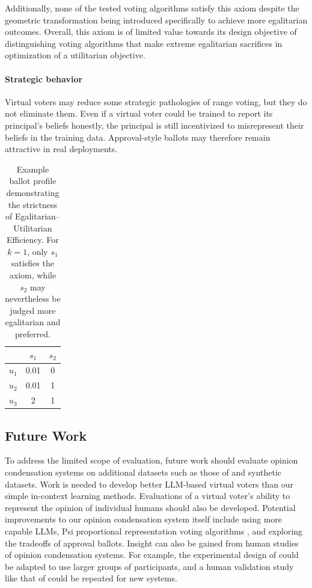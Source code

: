 \documentclass[11pt]{article}
\begin{document}
Additionally, none of the tested voting algorithms satisfy this axiom despite the geometric transformation being introduced specifically to achieve more egalitarian outcomes. Overall, this axiom is of limited value towards its design objective of distinguishing voting algorithms that make extreme egalitarian sacrifices in optimization of a utilitarian objective.

\paragraph{Strategic behavior}
Virtual voters may reduce some strategic pathologies of range voting, but they do not eliminate them. Even if a virtual voter could be trained to report its principal's beliefs honestly, the principal is still incentivized to misrepresent their beliefs in the training data. Approval-style ballots may therefore remain attractive in real deployments.

\begin{table}[t]
\centering
\begin{tabular}{lcc}
\hline
 & $s_1$ & $s_2$ \\
\hline
$u_1$ & 0.01 & 0 \\
$u_2$ & 0.01 & 1 \\
$u_3$ & 2 & 1 \\
\hline
\end{tabular}
\caption{Example ballot profile demonstrating the strictness of Egalitarian--Utilitarian Efficiency. For \(k=1\), only \(s_1\) satisfies the axiom, while \(s_2\) may nevertheless be judged more egalitarian and preferred.}
\label{tab:egal-util-strict}
\end{table}

\subsection{Future Work}

To address the limited scope of evaluation, future work should evaluate opinion condensation systems on additional datasets such as those of \citet{gsc-next-gen} and synthetic datasets. Work is needed to develop  better LLM-based virtual voters than our simple in-context learning methods. Evaluations of a virtual voter's ability to represent the opinion of individual humans should also be developed. Potential improvements to our opinion condensation system itself include using more capable LLMs, Psi proportional representation voting algorithms \citep{rangevoting-optimal-pr}, and exploring the tradeoffs of approval ballots. Insight can also be gained from human studies of opinion condensation systems. For example, the experimental design of \citet{habermas-machine} could be adapted to use larger groups of participants, and a human validation study like that of \citet{fish-v2} could be repeated for new systems.
\end{document}
